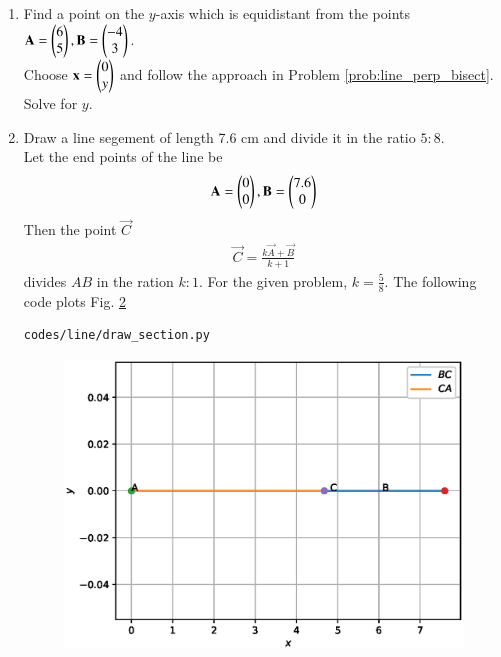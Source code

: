 \begin{enumerate}[label=\arabic*.,ref=\thesubsection.\theenumi]
\begin{figure}[!ht]
\caption{}
\label{fig:line_perp_bisect}
\end{figure}
%

\item Find a point on the $y$-axis which is equidistant from the points $\mathbf{A} = \begin{pmatrix}6\\5\end{pmatrix}, \mathbf{B} = \begin{pmatrix}-4\\3\end{pmatrix}$.
\\
\solution Choose $\mathbf{x} = \begin{pmatrix}0\\y\end{pmatrix}$ and follow the approach in Problem \eqref{prob:line_perp_bisect}. Solve for $y$.

\item Draw a line segement of length 7.6 cm and divide it in the ratio $5:8$.
\\
\solution Let the end points of the line be 
\begin{align}
\mathbf{A} = \begin{pmatrix}0\\0\end{pmatrix}, \mathbf{B} = \begin{pmatrix}7.6\\0\end{pmatrix}
\end{align}
Then the point $\vec{C}$
\begin{align}
\label{eq:line_section_form}
\vec{C} = \frac{k \vec{A} + \vec{B}}{k+1}
\end{align}
divides $AB$ in the ration $k:1$. For the given problem, $k = \frac{5}{8}$.
The following code plots Fig. \ref{fig:section}
\begin{lstlisting}
codes/line/draw_section.py
\end{lstlisting}
\begin{figure}[!ht]
\includegraphics[width=\columnwidth]{./line/figs/section.eps}
\caption{}
\label{fig:section}
\end{figure}

\end{enumerate}
